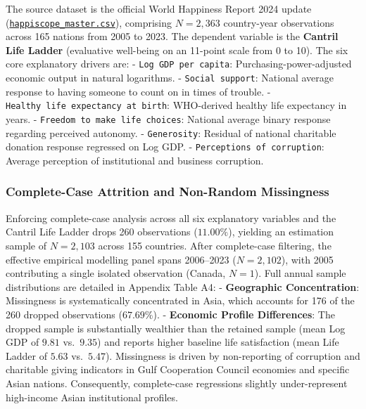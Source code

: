 \documentclass[
]{article}
\begin{document}
The source dataset is the official World Happiness Report 2024 update
(\href{file:///Users/srinivasch/Desktop/Happiscope/data/happiscope_master.csv}{\texttt{happiscope\_master.csv}}),
comprising \(N = 2,363\) country-year observations across 165 nations
from 2005 to 2023. The dependent variable is the \textbf{Cantril Life
Ladder} (evaluative well-being on an 11-point scale from 0 to 10). The
six core explanatory drivers are: - \texttt{Log\ GDP\ per\ capita}:
Purchasing-power-adjusted economic output in natural logarithms. -
\texttt{Social\ support}: National average response to having someone to
count on in times of trouble. -
\texttt{Healthy\ life\ expectancy\ at\ birth}: WHO-derived healthy life
expectancy in years. - \texttt{Freedom\ to\ make\ life\ choices}:
National average binary response regarding perceived autonomy. -
\texttt{Generosity}: Residual of national charitable donation response
regressed on Log GDP. - \texttt{Perceptions\ of\ corruption}: Average
perception of institutional and business corruption.

\hypertarget{complete-case-attrition-and-non-random-missingness}{%
\subsubsection{Complete-Case Attrition and Non-Random
Missingness}\label{complete-case-attrition-and-non-random-missingness}}

Enforcing complete-case analysis across all six explanatory variables
and the Cantril Life Ladder drops 260 observations (\(11.00\%\)),
yielding an estimation sample of \(N = 2,103\) across 155 countries.
After complete-case filtering, the effective empirical modelling panel
spans 2006--2023 (\(N = 2,102\)), with 2005 contributing a single
isolated observation (Canada, \(N=1\)). Full annual sample distributions
are detailed in Appendix Table A4: - \textbf{Geographic Concentration}:
Missingness is systematically concentrated in Asia, which accounts for
176 of the 260 dropped observations (\(67.69\%\)). - \textbf{Economic
Profile Differences}: The dropped sample is substantially wealthier than
the retained sample (mean Log GDP of \(9.81\) vs.~\(9.35\)) and reports
higher baseline life satisfaction (mean Life Ladder of \(5.63\)
vs.~\(5.47\)). Missingness is driven by non-reporting of corruption and
charitable giving indicators in Gulf Cooperation Council economies and
specific Asian nations. Consequently, complete-case regressions slightly
under-represent high-income Asian institutional profiles.
\end{document}

